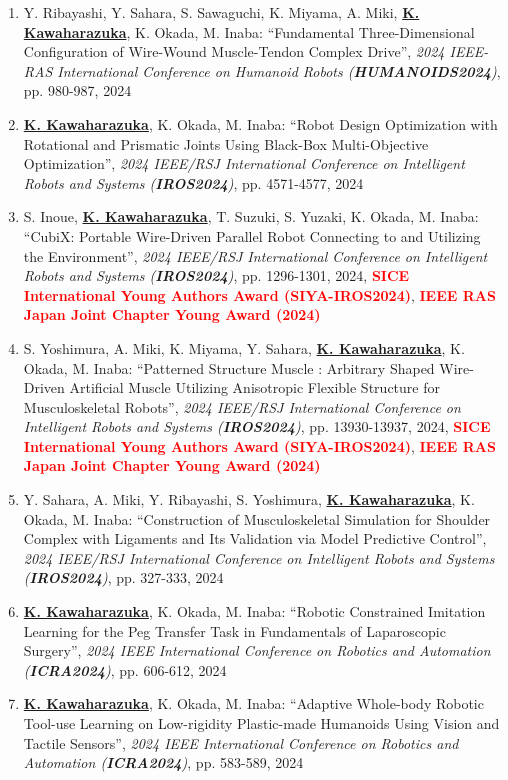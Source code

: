 \documentclass[letterpaper]{article}
\begin{document}
\begin{enumerate}
\item Y. Ribayashi, Y. Sahara, S. Sawaguchi, K. Miyama, A. Miki, \underline{\textbf{K. Kawaharazuka}}, K. Okada, M. Inaba: ``Fundamental Three-Dimensional Configuration of Wire-Wound Muscle-Tendon Complex Drive'', \textit{2024 IEEE-RAS International Conference on Humanoid Robots (\textit{\textbf{HUMANOIDS2024}})}, pp. 980-987, 2024
\item \underline{\textbf{K. Kawaharazuka}}, K. Okada, M. Inaba: ``Robot Design Optimization with Rotational and Prismatic Joints Using Black-Box Multi-Objective Optimization'', \textit{2024 IEEE/RSJ International Conference on Intelligent Robots and Systems (\textit{\textbf{IROS2024}})}, pp. 4571-4577, 2024
\item S. Inoue, \underline{\textbf{K. Kawaharazuka}}, T. Suzuki, S. Yuzaki, K. Okada, M. Inaba: ``CubiX: Portable Wire-Driven Parallel Robot Connecting to and Utilizing the Environment'', \textit{2024 IEEE/RSJ International Conference on Intelligent Robots and Systems (\textit{\textbf{IROS2024}})}, pp. 1296-1301, 2024, \textbf{\textcolor{red}{SICE International Young Authors Award (SIYA-IROS2024)}}, \textbf{\textcolor{red}{IEEE RAS Japan Joint Chapter Young Award (2024)}}
\item S. Yoshimura, A. Miki, K. Miyama, Y. Sahara, \underline{\textbf{K. Kawaharazuka}}, K. Okada, M. Inaba: ``Patterned Structure Muscle : Arbitrary Shaped Wire-Driven Artificial Muscle Utilizing Anisotropic Flexible Structure for Musculoskeletal Robots'', \textit{2024 IEEE/RSJ International Conference on Intelligent Robots and Systems (\textit{\textbf{IROS2024}})}, pp. 13930-13937, 2024, \textbf{\textcolor{red}{SICE International Young Authors Award (SIYA-IROS2024)}}, \textbf{\textcolor{red}{IEEE RAS Japan Joint Chapter Young Award (2024)}}
\item Y. Sahara, A. Miki, Y. Ribayashi, S. Yoshimura, \underline{\textbf{K. Kawaharazuka}}, K. Okada, M. Inaba: ``Construction of Musculoskeletal Simulation for Shoulder Complex with Ligaments and Its Validation via Model Predictive Control'', \textit{2024 IEEE/RSJ International Conference on Intelligent Robots and Systems (\textit{\textbf{IROS2024}})}, pp. 327-333, 2024
\item \underline{\textbf{K. Kawaharazuka}}, K. Okada, M. Inaba: ``Robotic Constrained Imitation Learning for the Peg Transfer Task in Fundamentals of Laparoscopic Surgery'', \textit{2024 IEEE International Conference on Robotics and Automation (\textit{\textbf{ICRA2024}})}, pp. 606-612, 2024
\item \underline{\textbf{K. Kawaharazuka}}, K. Okada, M. Inaba: ``Adaptive Whole-body Robotic Tool-use Learning on Low-rigidity Plastic-made Humanoids Using Vision and Tactile Sensors'', \textit{2024 IEEE International Conference on Robotics and Automation (\textit{\textbf{ICRA2024}})}, pp. 583-589, 2024

\end{enumerate}
\end{document}
